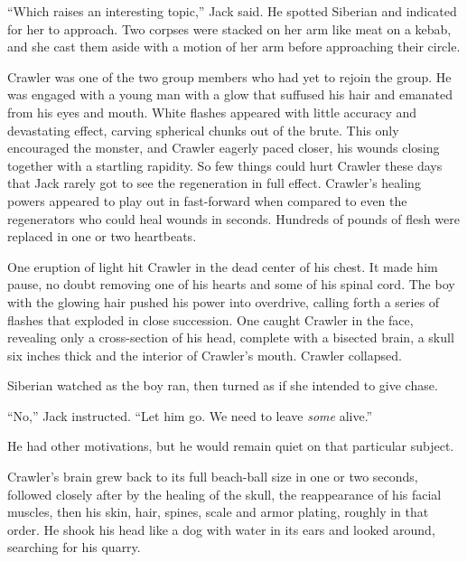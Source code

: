 ``Which raises an interesting topic,'' Jack said.  He spotted Siberian and indicated for her to approach.  Two corpses were stacked on her arm like meat on a kebab, and she cast them aside with a motion of her arm before approaching their circle.



Crawler was one of the two group members who had yet to rejoin the group.  He was engaged with a young man with a glow that suffused his hair and emanated from his eyes and mouth.  White flashes appeared with little accuracy and devastating effect, carving spherical chunks out of the brute.  This only encouraged the monster, and Crawler eagerly paced closer, his wounds closing together with a startling rapidity.  So few things could hurt Crawler these days that Jack rarely got to see the regeneration in full effect.  Crawler's healing powers appeared to play out in fast-forward when compared to even the regenerators who could heal wounds in seconds.  Hundreds of pounds of flesh were replaced in one or two heartbeats.



One eruption of light hit Crawler in the dead center of his chest.  It made him pause, no doubt removing one of his hearts and some of his spinal cord.  The boy with the glowing hair pushed his power into overdrive, calling forth a series of flashes that exploded in close succession.  One caught Crawler in the face, revealing only a cross-section of his head, complete with a bisected brain, a skull six inches thick and the interior of Crawler's mouth.  Crawler collapsed.



Siberian watched as the boy ran, then turned as if she intended to give chase.



``No,'' Jack instructed.  ``Let him go.  We need to leave \emph{some} alive.''



He had other motivations, but he would remain quiet on that particular subject.



Crawler's brain grew back to its full beach-ball size in one or two seconds, followed closely after by the healing of the skull, the reappearance of his facial muscles, then his skin, hair, spines, scale and armor plating, roughly in that order.  He shook his head like a dog with water in its ears and looked around, searching for his quarry.



